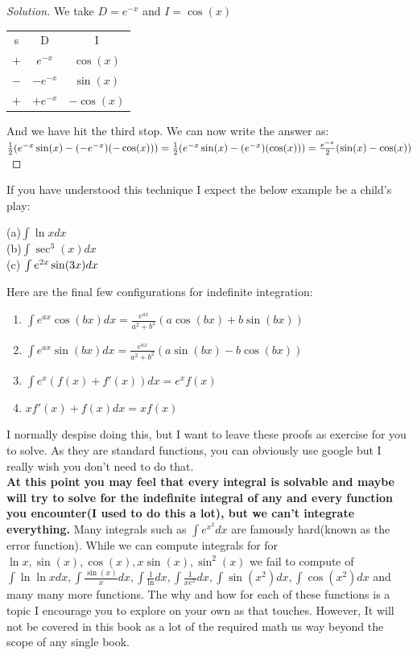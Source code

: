 \begin{proof}
    [Solution]
    We take $D=e^{-x}$ and $I=\cos(x)$
    \begin{table}[ht]
        \centering
        \begin{tabular}{c|c|c}
            s & D & I\\
            $+$ & $e^{-x}$ & $\cos(x)$\\
            $-$ & $-e^{-x}$ & $\sin(x)$\\
            $+$ & $+e^{-x}$ & $-\cos(x)$
        \end{tabular}
    \end{table}
    And we have hit the third stop. We can now write the answer as:\\
    $\frac{1}{2}(e^{-x}\sin(x)-(-e^{-x})(-\cos(x)))\\
    = \frac{1}{2}(e^{-x}\sin(x)-(e^{-x})(\cos(x)))\\
    = \frac{e^{-x}}{2}(\sin(x)-\cos(x))
    $
\end{proof}
If you have understood this technique I expect the below example be a child's play:\\
\begin{example}
    (a)$\int \ln{x} dx$\\
    (b)$\int \sec^3(x) dx$\\
    (c) $\int e^{2x} \sin(3x) dx\\$
\end{example}
Here are the final few configurations for indefinite integration:\\
\begin{theorem}
    \begin{enumerate}
        \item $\int e^{ax}\cos(bx)dx=\frac{e^{ax}}{a^2+b^2}(a\cos(bx)+b\sin(bx))$\\
        \item $\int e^{ax}\sin(bx)dx=\frac{e^{ax}}{a^2+b^2}(a\sin(bx)-b\cos(bx))$
        \item $\int e^x(f(x)+f'(x)) dx = e^x f(x)$
        \item $xf'(x) + f(x) dx= xf(x)$        
    \end{enumerate}
\end{theorem}
I normally despise doing this, but I want to leave these proofs as exercise for you to solve. As they are standard functions, you can obviously use google but I really wish you don't need to do that.\\
\textbf{At this point you may feel that every integral is solvable and maybe will try to solve for the indefinite integral of any and every function you encounter(I used to do this a lot), but we can't integrate everything.} Many integrals such as $\int e^{x^2} dx$ are famously hard(known as the error function). While we can compute integrals for for $\ln{x}, \sin(x), \cos(x), x\sin(x),\sin^2(x)$ we fail to compute of $\int \ln{\ln{x}} dx, \int \frac{\sin(x)}{x} dx, \int \frac{1}{\ln} dx, \int \frac{1}{xe^x} dx, \int \sin(x^2)dx, \int \cos(x^2)dx$ and many many more functions. The why and how for each of these functions is a topic I encourage you to explore on your own as that touches. However, It will not be covered in this book as a lot of the required math us way beyond the scope of any single book.
